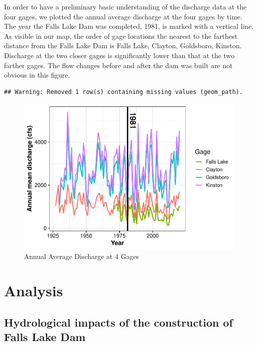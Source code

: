 \documentclass[
  12pt,
]{article}
\begin{document}
In order to have a preliminary basic understanding of the discharge data
at the four gages, we plotted the annual average discharge at the four
gages by time. The year the Falls Lake Dam was completed, 1981, is
marked with a vertical line. As visible in our map, the order of gage
locations the nearest to the farthest distance from the Falls Lake Dam
is Falls Lake, Clayton, Goldsboro, Kinston. Discharge at the two closer
gages is significantly lower than that at the two farther gages. The
flow changes before and after the dam was built are not obvious in this
figure.

\begin{verbatim}
## Warning: Removed 1 row(s) containing missing values (geom_path).
\end{verbatim}

\begin{figure}

\includegraphics{Gardner_Zeng_pdf_output_files/figure-latex/Plot annual mean discharge-1} \hfill{}

\caption{Annual Average Discharge at 4 Gages}\label{fig:Plot annual mean discharge}
\end{figure}

\hypertarget{analysis}{%
\section{Analysis}\label{analysis}}

\hypertarget{hydrological-impacts-of-the-construction-of-falls-lake-dam}{%
\subsection{Hydrological impacts of the construction of Falls Lake
Dam}\label{hydrological-impacts-of-the-construction-of-falls-lake-dam}}
\end{document}
